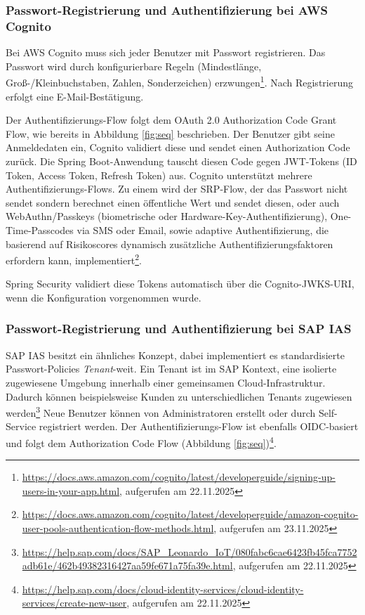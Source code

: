 \subsubsection{Passwort-Registrierung und Authentifizierung bei AWS Cognito}

Bei AWS Cognito muss sich jeder Benutzer mit Passwort registrieren. Das Passwort wird durch konfigurierbare Regeln (Mindestlänge, Groß-/Kleinbuchstaben, Zahlen, Sonderzeichen) erzwungen\footnote{\url{https://docs.aws.amazon.com/cognito/latest/developerguide/signing-up-users-in-your-app.html}, aufgerufen am 22.11.2025}. Nach Registrierung erfolgt eine E-Mail-Bestätigung.

Der Authentifizierungs-Flow folgt dem OAuth 2.0 Authorization Code Grant Flow, wie bereits in Abbildung \ref{fig:seq} beschrieben. Der Benutzer gibt seine Anmeldedaten ein, Cognito validiert diese und sendet einen Authorization Code zurück. Die Spring Boot-Anwendung tauscht diesen Code gegen \ac{JWT}-Tokens (ID Token, Access Token, Refresh Token) aus.
Cognito unterstützt mehrere Authentifizierungs-Flows. Zu einem wird der \ac{SRP}-Flow, der das Passwort nicht sendet sondern berechnet einen öffentliche Wert und sendet diesen, oder auch WebAuthn/Passkeys (biometrische oder Hardware-Key-Authentifizierung), One-Time-Passcodes via SMS oder Email, sowie adaptive Authentifizierung, die basierend auf Risikoscores dynamisch zusätzliche Authentifizierungsfaktoren erfordern kann, implementiert\footnote{\url{https://docs.aws.amazon.com/cognito/latest/developerguide/amazon-cognito-user-pools-authentication-flow-methods.html}, aufgerufen am 23.11.2025}.

Spring Security validiert diese Tokens automatisch über die Cognito-\ac{JWKS}-URI, wenn die Konfiguration vorgenommen wurde.

\subsubsection{Passwort-Registrierung und Authentifizierung bei \ac{SAP IAS}}

\ac{SAP IAS} besitzt ein ähnliches Konzept, dabei implementiert es standardisierte Passwort-Policies \textit{Tenant}-weit. Ein Tenant ist im SAP Kontext, eine isolierte zugewiesene Umgebung innerhalb einer gemeinsamen Cloud-Infrastruktur. Dadurch können beispielsweise Kunden zu unterschiedlichen Tenants zugewiesen werden\footnote{\url{https://help.sap.com/docs/SAP_Leonardo_IoT/080fabc6cae6423fb45fca7752adb61e/462b49382316427aa59fe671a75fa39e.html}, aufgerufen am 22.11.2025} Neue Benutzer können von Administratoren erstellt oder durch Self-Service registriert werden. Der Authentifizierungs-Flow ist ebenfalls \ac{OIDC}-basiert und folgt dem Authorization Code Flow (Abbildung \ref{fig:seq})\footnote{\url{https://help.sap.com/docs/cloud-identity-services/cloud-identity-services/create-new-user}, aufgerufen am 22.11.2025}.

